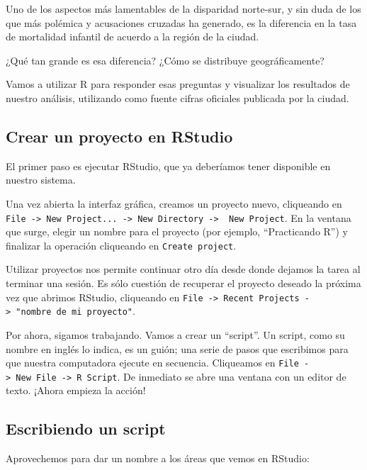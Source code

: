 \documentclass[]{book}
\begin{document}
Uno de los aspectos más lamentables de la disparidad norte-sur, y sin
duda de los que más polémica y acusaciones cruzadas ha generado, es la
diferencia en la tasa de mortalidad infantil de acuerdo a la región de
la ciudad.

¿Qué tan grande es esa diferencia? ¿Cómo se distribuye geográficamente?

Vamos a utilizar R para responder esas preguntas y visualizar los
resultados de nuestro análisis, utilizando como fuente cifras oficiales
publicada por la ciudad.

\subsection{Crear un proyecto en
RStudio}\label{crear-un-proyecto-en-rstudio}

El primer paso es ejecutar RStudio, que ya deberíamos tener disponible
en nuestro sistema.

Una vez abierta la interfaz gráfica, creamos un proyecto nuevo,
cliqueando en
\texttt{File\ -\textgreater{}\ New\ Project...\ -\textgreater{}\ New\ Directory\ -\textgreater{}\ \ New\ Project}.
En la ventana que surge, elegir un nombre para el proyecto (por ejemplo,
``Practicando R'') y finalizar la operación cliqueando en
\texttt{Create\ project}.

Utilizar proyectos nos permite continuar otro día desde donde dejamos la
tarea al terminar una sesión. Es sólo cuestión de recuperar el proyecto
deseado la próxima vez que abrimos RStudio, cliqueando en
\texttt{File\ -\textgreater{}\ Recent\ Projects\ -\textgreater{}\ "nombre\ de\ mi\ proyecto"}.

Por ahora, sigamos trabajando. Vamos a crear un ``script''. Un script,
como su nombre en inglés lo indica, es un guión; una serie de pasos que
escribimos para que nuestra computadora ejecute en secuencia. Cliqueamos
en
\texttt{File\ -\textgreater{}\ New\ File\ -\textgreater{}\ R\ Script}.
De inmediato se abre una ventana con un editor de texto. ¡Ahora empieza
la acción!

\subsection{Escribiendo un script}\label{escribiendo-un-script}

Aprovechemos para dar un nombre a los áreas que vemos en RStudio:
\end{document}
